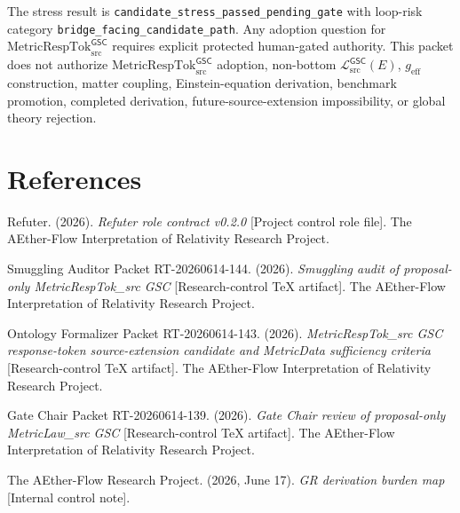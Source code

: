 \documentclass[11pt]{article}
\newcommand{\MetricRespTok}{\mathrm{MetricRespTok}_{\mathrm{src}}^{\mathsf{GSC}}}
\newcommand{\MetricData}{\mathcal{L}_{\mathrm{src}}^{\mathsf{GSC}}}
\newcommand{\geff}{g_{\mathrm{eff}}}
\begin{document}
The stress result is
\texttt{candidate\_stress\_passed\_pending\_gate} with loop-risk category
\texttt{bridge\_facing\_candidate\_path}. Any adoption question for
\(\MetricRespTok\) requires explicit protected human-gated authority. This
packet does not authorize \(\MetricRespTok\) adoption, non-bottom
\(\MetricData(E)\), \(\geff\) construction, matter coupling, Einstein-equation
derivation, benchmark promotion, completed derivation,
future-source-extension impossibility, or global theory rejection.

\section*{References}

Refuter. (2026). \textit{Refuter role contract v0.2.0} [Project control role
file]. The AEther-Flow Interpretation of Relativity Research Project.

Smuggling Auditor Packet RT-20260614-144. (2026). \textit{Smuggling audit of
proposal-only MetricRespTok\_src GSC} [Research-control TeX artifact]. The
AEther-Flow Interpretation of Relativity Research Project.

Ontology Formalizer Packet RT-20260614-143. (2026). \textit{MetricRespTok\_src
GSC response-token source-extension candidate and MetricData sufficiency
criteria} [Research-control TeX artifact]. The AEther-Flow Interpretation of
Relativity Research Project.

Gate Chair Packet RT-20260614-139. (2026). \textit{Gate Chair review of
proposal-only MetricLaw\_src GSC} [Research-control TeX artifact]. The
AEther-Flow Interpretation of Relativity Research Project.

The AEther-Flow Research Project. (2026, June 17). \textit{GR derivation
burden map} [Internal control note].
\end{document}
